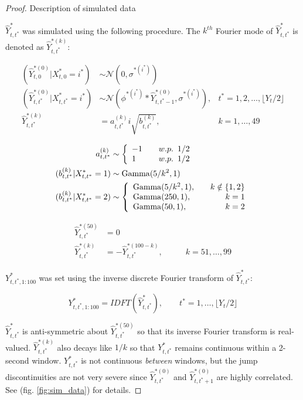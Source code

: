 \begin{proof}{Description of simulated data}{}

$\hat{Y}^*_{t,t^*}$ was simulated using the following procedure. The $k^{th}$ Fourier mode of $\hat{Y}^*_{t,t^*}$ is denoted as $\hat{Y}^{*(k)}_{t,t^*}$:

\begin{align}
	(\hat{Y}^{*(0)}_{t,0}|X^*_{t,0} = i^*) &\sim \mathcal{N} \left(0, \sigma^{*(i^*)} \right) & \nonumber \\
	(\hat{Y}^{*(0)}_{t,t^*}|X^*_{t,t^*} = i^*) &\sim \mathcal{N} \left(\phi^{*(i^*)} * \hat{Y}^{*(0)}_{t,t^*-1}, \sigma^{*(i^*)} \right), & t^* = 1,2,\ldots, \lfloor Y_t/2 \rfloor \label{eqn:y_hat0} \\
	\hat{Y}^{*(k)}_{t,t^*} &= a_{t,t^*}^{(k)} i\sqrt{b^{(k)}_{t,t^*}}, & k = 1,\ldots,49 \nonumber
\end{align}

\begin{align*}
    a_{t,t^*}^{(k)} &\sim  \left\{\begin{array}{lr}
	-1 & \quad w.p. \enspace 1/2 \\
	1  & \quad w.p. \enspace 1/2
	\end{array}\right. \\
	(b^{(k)}_{t,t^*}|X^*_{t,t^*}  = 1) &\sim {\rm{Gamma}}(5/k^2, 1) \\
	(b^{(k)}_{t,t^*}|X^*_{t,t^*} = 2) &\sim \left\{\begin{array}{lr}
	{\rm{Gamma}}(5/k^2, 1), \quad & k \notin \{1,2\} \\
	{\rm{Gamma}}(250,1), & k = 1 \\
	{\rm{Gamma}}(50,1), & k = 2
	\end{array}\right. 
\end{align*}

\begin{align*}
    \hat{Y}^{*(50)}_{t,t^*} &= 0 & \\
	\hat{Y}^{*(k)}_{t,t^*}  &= -\hat{Y}^{*(100-k)}_{t,t^*}, & \qquad k = 51,\ldots,99
\end{align*}

$Y^*_{t,t^*,1:100}$ was set using the inverse discrete Fourier transform of $\hat{Y}^*_{t,t^*}$:

$$Y^*_{t,t^*,1:100} = IDFT\left(\hat{Y}^*_{t,t^*}\right), \qquad t^* = 1,\ldots,\lfloor Y_t/2 \rfloor$$

$\hat{Y}^*_{t,t^*}$ is anti-symmetric about $\hat{Y}^{*(50)}_{t,t^*}$ so that its inverse Fourier transform is real-valued. $\hat{Y}^{*(k)}_{t,t^*}$ also decays like $1/k$ so that $Y^*_{t,t^*}$ remains continuous within a 2-second window. $Y^*_{t,t^*}$ is not continuous \textit{between} windows, but the jump discontinuities are not very severe since $\hat{Y}^{*(0)}_{t,t^*}$ and $\hat{Y}^{*(0)}_{t,t^*+1}$ are highly correlated. See (fig. \ref{fig:sim_data}) for details. 


\end{proof}
